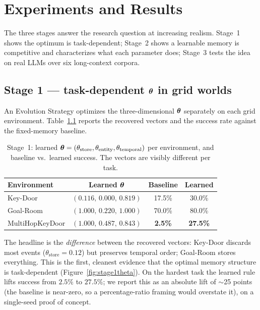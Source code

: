\chapter{Experiments and Results}
\label{ch:results}

The three stages answer the research question at increasing realism. Stage~1
shows the optimum is task-dependent; Stage~2 shows a learnable memory is
competitive and characterizes what each parameter does; Stage~3 tests the idea
on real LLMs over six long-context corpora.

\section{Stage 1 --- task-dependent \texorpdfstring{$\boldsymbol{\theta}$}{theta} in grid worlds}
\label{sec:stage1}
An Evolution Strategy optimizes the three-dimensional $\boldsymbol{\theta}$ separately on
each grid environment. Table~\ref{tab:stage1} reports the recovered vectors and
the success rate against the fixed-memory baseline.

\begin{table}[t]
\centering
\caption{Stage~1: learned $\boldsymbol{\theta}=(\theta_{\mathrm{store}},
\theta_{\mathrm{entity}}, \theta_{\mathrm{temporal}})$ per environment, and
baseline vs.\ learned success. The vectors are visibly different per task.}
\label{tab:stage1}
\begin{tabular}{lccc}
\toprule
Environment & Learned $\boldsymbol{\theta}$ & Baseline & Learned \\
\midrule
Key-Door          & $(0.116,\,0.000,\,0.819)$ & 17.5\% & 30.0\% \\
Goal-Room         & $(1.000,\,0.220,\,1.000)$ & 70.0\% & 80.0\% \\
MultiHopKeyDoor   & $(1.000,\,0.487,\,0.843)$ & \textbf{2.5\%} & \textbf{27.5\%} \\
\bottomrule
\end{tabular}
\end{table}

The headline is the \emph{difference} between the recovered vectors:
Key-Door discards most events ($\theta_{\mathrm{store}}{=}0.12$) but preserves
temporal order; Goal-Room stores everything. This is the first, cleanest
evidence that the optimal memory structure is task-dependent
(Figure~\ref{fig:stage1theta}). On the hardest task the learned rule lifts
success from $2.5\%$ to $27.5\%$; we report this as an absolute lift of
$\sim$25 points (the baseline is near-zero, so a percentage-ratio framing would
overstate it), on a single-seed proof of concept.

